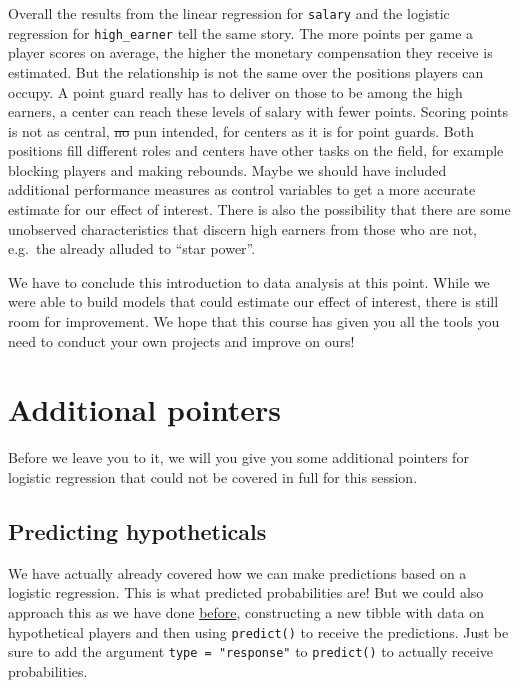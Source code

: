 \documentclass[
]{book}
\begin{document}
Overall the results from the linear regression for \texttt{salary} and the
logistic regression for \texttt{high\_earner} tell the same story. The more
points per game a player scores on average, the higher the monetary
compensation they receive is estimated. But the relationship is not the
same over the positions players can occupy. A point guard really has to
deliver on those to be among the high earners, a center can reach
these levels of salary with fewer points. Scoring points is not as
central, \st{no} pun intended, for centers as it is for point guards. Both
positions fill different roles and centers have other tasks on the field, for
example blocking players and making rebounds. Maybe we should have included
additional performance measures as control variables to get a more accurate
estimate for our effect of interest. There is also the possibility that there
are some unobserved characteristics that discern high earners from those who are
not, e.g.~the already alluded to ``star power''.

We have to conclude this introduction to data analysis at this point.
While we were able to build models that could estimate our effect of interest,
there is still room for improvement. We hope that this course has given you all
the tools you need to conduct your own projects and improve on ours!

\hypertarget{additional-pointers}{%
\section{Additional pointers}\label{additional-pointers}}

Before we leave you to it, we will you give you some additional pointers for
logistic regression that could not be covered in full for this session.

\hypertarget{predicting-hypotheticals-1}{%
\subsection{Predicting hypotheticals}\label{predicting-hypotheticals-1}}

We have actually already covered how we can make predictions based on a logistic
regression. This is what predicted probabilities are!
But we could also approach this as we have done \protect\hyperlink{pm-t}{before}, constructing
a new tibble with data on hypothetical players and then using \texttt{predict()} to
receive the predictions. Just be sure to add the argument \texttt{type\ =\ "response"} to
\texttt{predict()} to actually receive probabilities.
\end{document}
